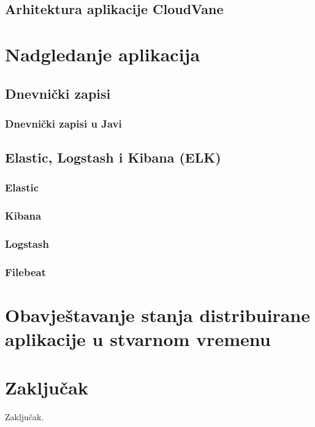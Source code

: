 \documentclass[times, utf8, diplomski]{fer}
\begin{document}
\section{Arhitektura aplikacije CloudVane}
\label{sec:architecture}



\chapter{Nadgledanje aplikacija}

\section{Dnevnički zapisi}
\label{sec:logs}
\subsection{Dnevnički zapisi u Javi}

\section{Elastic, Logstash i Kibana (ELK)}

\subsection{Elastic}

\subsection{Kibana}

\subsection{Logstash}

\subsection{Filebeat}

\chapter{Obavještavanje stanja distribuirane aplikacije u stvarnom vremenu}

\chapter{Zaključak}
Zaključak.
\end{document}
